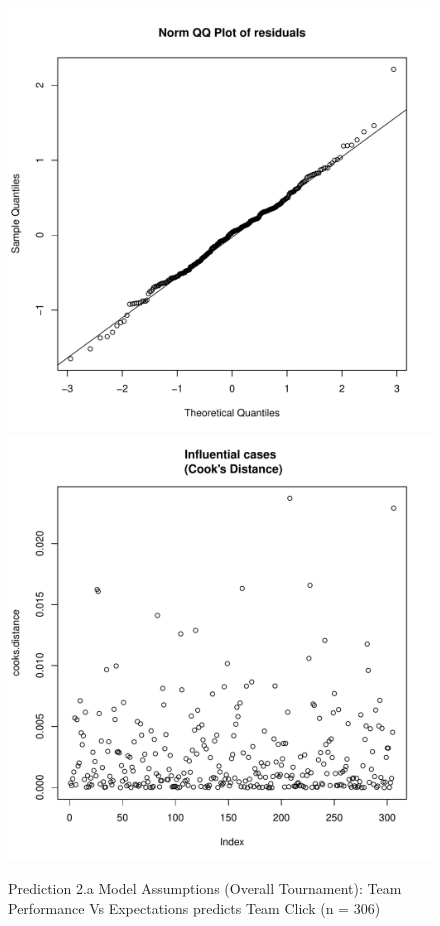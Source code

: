 \begin{CJK}{UTF8}{gbsn}
\begin{figure}[!htbp]
         \includegraphics[scale =.4]{images/MLM31aQQNorm.pdf}
         \includegraphics[scale =.4]{images/MLM31aCooksD.pdf}
         \caption{Prediction 2.a Model Assumptions (Overall Tournament): Team Performance Vs Expectations predicts Team Click (n = 306)}
         \label{fig:MLM31aAssumptions}
       \end{figure}







\end{CJK}

